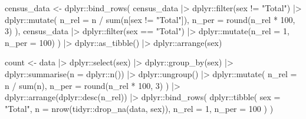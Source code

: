 \documentclass[
  12pt,
  a4paper,
  oneside]{tesesusp}
\newenvironment{Shaded}{\begin{snugshade}}{\end{snugshade}}
\newcommand{\AttributeTok}[1]{\textcolor[rgb]{0.40,0.45,0.13}{#1}}
\newcommand{\DecValTok}[1]{\textcolor[rgb]{0.68,0.00,0.00}{#1}}
\newcommand{\FunctionTok}[1]{\textcolor[rgb]{0.28,0.35,0.67}{#1}}
\newcommand{\NormalTok}[1]{\textcolor[rgb]{0.00,0.23,0.31}{#1}}
\newcommand{\OtherTok}[1]{\textcolor[rgb]{0.00,0.23,0.31}{#1}}
\newcommand{\SpecialCharTok}[1]{\textcolor[rgb]{0.37,0.37,0.37}{#1}}
\newcommand{\StringTok}[1]{\textcolor[rgb]{0.13,0.47,0.30}{#1}}
\begin{document}
\begin{Shaded}
\begin{Highlighting}[numbers=left,,]
\NormalTok{census\_data }\OtherTok{\textless{}{-}} 
\NormalTok{  dplyr}\SpecialCharTok{::}\FunctionTok{bind\_rows}\NormalTok{(}
\NormalTok{    census\_data }\SpecialCharTok{|\textgreater{}}
\NormalTok{      dplyr}\SpecialCharTok{::}\FunctionTok{filter}\NormalTok{(sex }\SpecialCharTok{!=} \StringTok{"Total"}\NormalTok{) }\SpecialCharTok{|\textgreater{}}
\NormalTok{      dplyr}\SpecialCharTok{::}\FunctionTok{mutate}\NormalTok{(}
        \AttributeTok{n\_rel =}\NormalTok{ n }\SpecialCharTok{/} \FunctionTok{sum}\NormalTok{(n[sex }\SpecialCharTok{!=} \StringTok{"Total"}\NormalTok{]),}
        \AttributeTok{n\_per =} \FunctionTok{round}\NormalTok{(n\_rel }\SpecialCharTok{*} \DecValTok{100}\NormalTok{, }\DecValTok{3}\NormalTok{)}
\NormalTok{      ),}
\NormalTok{    census\_data }\SpecialCharTok{|\textgreater{}}
\NormalTok{      dplyr}\SpecialCharTok{::}\FunctionTok{filter}\NormalTok{(sex }\SpecialCharTok{==} \StringTok{"Total"}\NormalTok{) }\SpecialCharTok{|\textgreater{}}
\NormalTok{      dplyr}\SpecialCharTok{::}\FunctionTok{mutate}\NormalTok{(}\AttributeTok{n\_rel =} \DecValTok{1}\NormalTok{, }\AttributeTok{n\_per =} \DecValTok{100}\NormalTok{)}
\NormalTok{  ) }\SpecialCharTok{|\textgreater{}}
\NormalTok{  dplyr}\SpecialCharTok{::}\FunctionTok{as\_tibble}\NormalTok{() }\SpecialCharTok{|\textgreater{}}
\NormalTok{  dplyr}\SpecialCharTok{::}\FunctionTok{arrange}\NormalTok{(sex)}

\NormalTok{count }\OtherTok{\textless{}{-}}\NormalTok{ data }\SpecialCharTok{|\textgreater{}}
\NormalTok{  dplyr}\SpecialCharTok{::}\FunctionTok{select}\NormalTok{(sex) }\SpecialCharTok{|\textgreater{}}
\NormalTok{  dplyr}\SpecialCharTok{::}\FunctionTok{group\_by}\NormalTok{(sex) }\SpecialCharTok{|\textgreater{}}
\NormalTok{  dplyr}\SpecialCharTok{::}\FunctionTok{summarise}\NormalTok{(}\AttributeTok{n =}\NormalTok{ dplyr}\SpecialCharTok{::}\FunctionTok{n}\NormalTok{()) }\SpecialCharTok{|\textgreater{}}
\NormalTok{  dplyr}\SpecialCharTok{::}\FunctionTok{ungroup}\NormalTok{() }\SpecialCharTok{|\textgreater{}}
\NormalTok{  dplyr}\SpecialCharTok{::}\FunctionTok{mutate}\NormalTok{(}
    \AttributeTok{n\_rel =}\NormalTok{ n }\SpecialCharTok{/} \FunctionTok{sum}\NormalTok{(n),}
    \AttributeTok{n\_per =} \FunctionTok{round}\NormalTok{(n\_rel }\SpecialCharTok{*} \DecValTok{100}\NormalTok{, }\DecValTok{3}\NormalTok{)}
\NormalTok{  ) }\SpecialCharTok{|\textgreater{}}
\NormalTok{  dplyr}\SpecialCharTok{::}\FunctionTok{arrange}\NormalTok{(dplyr}\SpecialCharTok{::}\FunctionTok{desc}\NormalTok{(n\_rel)) }\SpecialCharTok{|\textgreater{}}
\NormalTok{  dplyr}\SpecialCharTok{::}\FunctionTok{bind\_rows}\NormalTok{(}
\NormalTok{    dplyr}\SpecialCharTok{::}\FunctionTok{tibble}\NormalTok{(}
      \AttributeTok{sex =} \StringTok{"Total"}\NormalTok{,}
      \AttributeTok{n =} \FunctionTok{nrow}\NormalTok{(tidyr}\SpecialCharTok{::}\FunctionTok{drop\_na}\NormalTok{(data, sex)),}
      \AttributeTok{n\_rel =} \DecValTok{1}\NormalTok{, }
      \AttributeTok{n\_per =} \DecValTok{100}
\NormalTok{    )}
\NormalTok{  )}


\end{Highlighting}
\end{Shaded}
\end{document}
